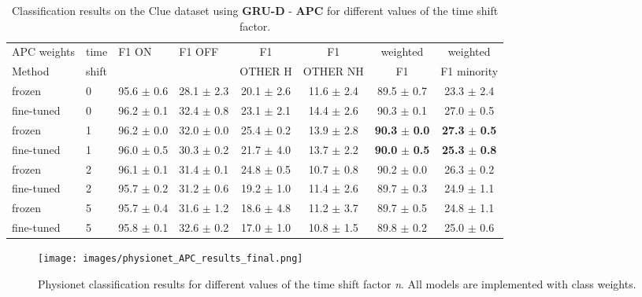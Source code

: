 \documentclass{article}
\begin{document}
\begin{table}[h]
\caption{
Classification results on the Clue dataset using \textbf{GRU-D} - \textbf{APC} for different values of the time shift factor.}
\label{tab:results_clue_APC_GRUD}
\vskip 0.1in
\begin{center}
\begin{small}
\begin{sc}
\begin{tabular}{llllcccc}
\toprule
{APC weights} & {time} &  {F1 ON} & {F1 OFF} & {F1} & {F1} & {weighted} & {weighted}\\
{Method} & {shift} &  &  & {OTHER H} & {OTHER NH} & {F1} & {F1 minority}\\
\midrule
{frozen} & 0 & 95.6 $\pm$ 0.6 & 28.1 $\pm$ 2.3 & 20.1 $\pm$ 2.6 & 11.6 $\pm$  2.4 & 89.5 $\pm$ 0.7 & 23.3 $\pm$ 2.4\\
\hline
{fine-tuned} &  0 & 96.2 $\pm$ 0.1 & 32.4 $\pm$ 0.8 & 23.1 $\pm$ 2.1 & 14.4 $\pm$ 2.6 & 90.3 $\pm$ 0.1 & 27.0 $\pm$ 0.5\\
\hline
{frozen} & 1 &  96.2 $\pm$ 0.0 & 32.0 $\pm$ 0.0 & 25.4 $\pm$ 0.2 & 13.9 $\pm$  2.8 &  \textbf{90.3} $\pm$ \textbf{0.0} & \textbf{27.3} $\pm$ \textbf{0.5} \\
\hline
{fine-tuned} &  1 & 96.0 $\pm$ 0.5 & 30.3 $\pm$ 0.2 & 21.7 $\pm$ 4.0 & 13.7 $\pm$ 2.2 & \textbf{90.0} $\pm$ \textbf{0.5} & \textbf{25.3} $\pm$ \textbf{0.8} \\
\hline
{frozen} &  2 &  96.1 $\pm$ 0.1 & 31.4 $\pm$ 0.1 & 24.8 $\pm$ 0.5 & 10.7 $\pm$  0.8 & 90.2 $\pm$ 0.0 & 26.3 $\pm$ 0.2\\
\hline
{fine-tuned} &  2 &  95.7 $\pm$ 0.2  & 31.2 $\pm$ 0.6  &  19.2 $\pm$ 1.0 & 11.4 $\pm$ 2.6  & 89.7 $\pm$ 0.3 & 24.9 $\pm$ 1.1 \\
\hline
{frozen} &  5 & 95.7 $\pm$ 0.4 & 31.6 $\pm$ 1.2 & 18.6 $\pm$ 4.8 & 11.2 $\pm$ 3.7 &  89.7 $\pm$ 0.5 & 24.8 $\pm$ 1.1\\
\hline
{fine-tuned} &  5 & 95.8 $\pm$ 0.1 & 32.6 $\pm$ 0.2 & 17.0 $\pm$ 1.0 & 10.8 $\pm$ 1.5 & 89.8 $\pm$ 0.2 & 25.0 $\pm$ 0.6\\
\bottomrule
\end{tabular}
\end{sc}
\end{small}
\end{center}
\vskip -0.15in
\end{table}

\begin{figure}[h]
\begin{center}
\centerline{\texttt{[image: images/physionet\_APC\_results\_final.png]}}
\vspace{-4mm}
\caption{Physionet classification results for different values of the time shift factor \textit{n}. All models are implemented with class weights.} 
\vspace{-2.5em}
\label{physionet_APC_plot}
\end{center}
\end{figure} 
\end{document}
